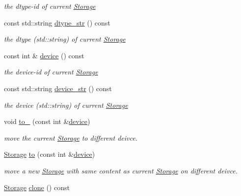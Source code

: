 \begin{DoxyCompactItemize}
\begin{DoxyCompactList}\small\item\em the dtype-\/id of current \hyperlink{classcytnx_1_1Storage}{Storage} \end{DoxyCompactList}\item 
const std\+::string \hyperlink{classcytnx_1_1Storage_ab6e9fb01ad4655701a2d54dc978eef17}{dtype\+\_\+str} () const
\begin{DoxyCompactList}\small\item\em the dtype (std\+::string) of current \hyperlink{classcytnx_1_1Storage}{Storage} \end{DoxyCompactList}\item 
const int \& \hyperlink{classcytnx_1_1Storage_a4c3e27582d7f951e6b76ccbb92f7c537}{device} () const
\begin{DoxyCompactList}\small\item\em the device-\/id of current \hyperlink{classcytnx_1_1Storage}{Storage} \end{DoxyCompactList}\item 
const std\+::string \hyperlink{classcytnx_1_1Storage_ae0d90d5275fa7e52a0a2dc10512ba71f}{device\+\_\+str} () const
\begin{DoxyCompactList}\small\item\em the device (std\+::string) of current \hyperlink{classcytnx_1_1Storage}{Storage} \end{DoxyCompactList}\item 
void \hyperlink{classcytnx_1_1Storage_a0bbf2cbefb5d0835bcb4f0d05e400870}{to\+\_\+} (const int \&\hyperlink{classcytnx_1_1Storage_a4c3e27582d7f951e6b76ccbb92f7c537}{device})
\begin{DoxyCompactList}\small\item\em move the current \hyperlink{classcytnx_1_1Storage}{Storage} to different deivce. \end{DoxyCompactList}\item 
\hyperlink{classcytnx_1_1Storage}{Storage} \hyperlink{classcytnx_1_1Storage_a2abfcaacf807934be5dd21c254fdb30e}{to} (const int \&\hyperlink{classcytnx_1_1Storage_a4c3e27582d7f951e6b76ccbb92f7c537}{device})
\begin{DoxyCompactList}\small\item\em move a new \hyperlink{classcytnx_1_1Storage}{Storage} with same content as current \hyperlink{classcytnx_1_1Storage}{Storage} on different deivce. \end{DoxyCompactList}\item 
\hyperlink{classcytnx_1_1Storage}{Storage} \hyperlink{classcytnx_1_1Storage_aed0530dd20f3fb352d45653ba46a3d50}{clone} () const

\end{DoxyCompactItemize}
